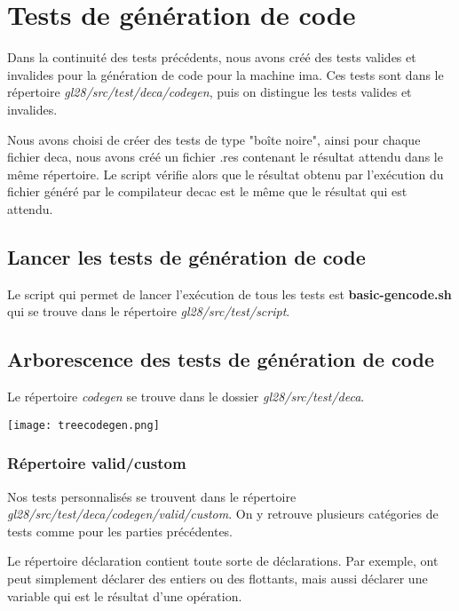 \documentclass[12pt, a4paper, one side]{article}
\begin{document}
\section{Tests de génération de code}
Dans la continuité des tests précédents, nous avons créé des tests valides et invalides pour la génération de code pour la machine ima. Ces tests sont dans le répertoire \textit{gl28/src/test/deca/codegen}, puis on distingue les tests valides et invalides.

\begin{flushleft}
Nous avons choisi de créer des tests de type "boîte noire", ainsi pour chaque fichier deca, nous avons créé un fichier .res contenant le résultat attendu dans le même répertoire. Le script vérifie alors que le résultat obtenu par l'exécution du fichier généré par le compilateur decac est le même que le résultat qui est attendu.
\end{flushleft}

\subsection{Lancer les tests de génération de code}
Le script qui permet de lancer l'exécution de tous les tests est \textbf{basic-gencode.sh} qui se trouve dans le répertoire \textit{gl28/src/test/script}.

\subsection{Arborescence des tests de génération de code}
Le répertoire \textit{codegen} se trouve dans le dossier \textit{gl28/src/test/deca}.
\begin{center}
    \texttt{[image: treecodegen.png]}
\end{center}
\subsubsection{Répertoire valid/custom}
Nos tests personnalisés se trouvent dans le répertoire \newline
\textit{gl28/src/test/deca/codegen/valid/custom}. On y retrouve plusieurs catégories de tests comme pour les parties précédentes.

\begin{flushleft}
Le répertoire déclaration contient toute sorte de déclarations. Par exemple, ont peut simplement déclarer des entiers ou des flottants, mais aussi déclarer une variable qui est le résultat d'une opération.
\end{flushleft}
\end{document}
